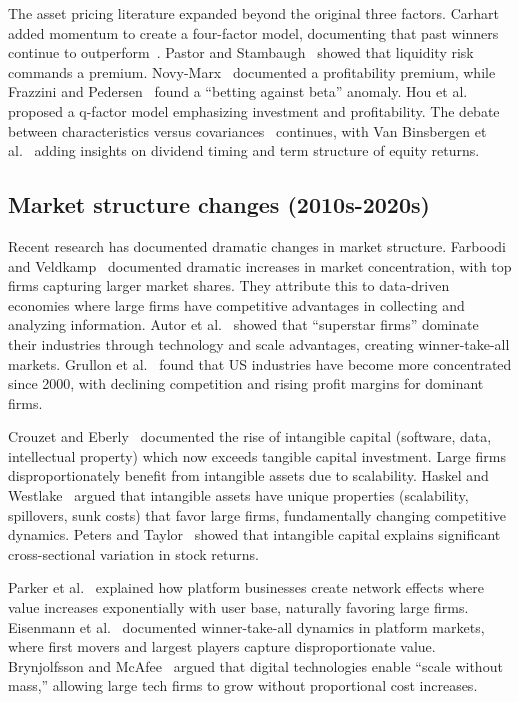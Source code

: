 \documentclass[10pt,letterpaper]{article}
\begin{document}
The asset pricing literature expanded beyond the original three factors. Carhart~\cite{carhart1997} added momentum to create a four-factor model, documenting that past winners continue to outperform~\cite{jegadeesh1993}. Pastor and Stambaugh~\cite{pastor2003} showed that liquidity risk commands a premium. Novy-Marx~\cite{novymarx2013} documented a profitability premium, while Frazzini and Pedersen~\cite{frazzini2014} found a ``betting against beta'' anomaly. Hou et al.~\cite{hou2015} proposed a q-factor model emphasizing investment and profitability. The debate between characteristics versus covariances~\cite{daniel1997} continues, with Van Binsbergen et al.~\cite{vanbinsbergen2012} adding insights on dividend timing and term structure of equity returns.

\subsection*{Market structure changes (2010s-2020s)}

Recent research has documented dramatic changes in market structure. Farboodi and Veldkamp~\cite{farboodi2020} documented dramatic increases in market concentration, with top firms capturing larger market shares. They attribute this to data-driven economies where large firms have competitive advantages in collecting and analyzing information. Autor et al.~\cite{autor2020} showed that ``superstar firms'' dominate their industries through technology and scale advantages, creating winner-take-all markets. Grullon et al.~\cite{grullon2019} found that US industries have become more concentrated since 2000, with declining competition and rising profit margins for dominant firms.

Crouzet and Eberly~\cite{crouzet2019} documented the rise of intangible capital (software, data, intellectual property) which now exceeds tangible capital investment. Large firms disproportionately benefit from intangible assets due to scalability. Haskel and Westlake~\cite{haskel2018} argued that intangible assets have unique properties (scalability, spillovers, sunk costs) that favor large firms, fundamentally changing competitive dynamics. Peters and Taylor~\cite{peters2017} showed that intangible capital explains significant cross-sectional variation in stock returns.

Parker et al.~\cite{parker2016} explained how platform businesses create network effects where value increases exponentially with user base, naturally favoring large firms. Eisenmann et al.~\cite{eisenmann2006} documented winner-take-all dynamics in platform markets, where first movers and largest players capture disproportionate value. Brynjolfsson and McAfee~\cite{brynjolfsson2014} argued that digital technologies enable ``scale without mass,'' allowing large tech firms to grow without proportional cost increases.
\end{document}
